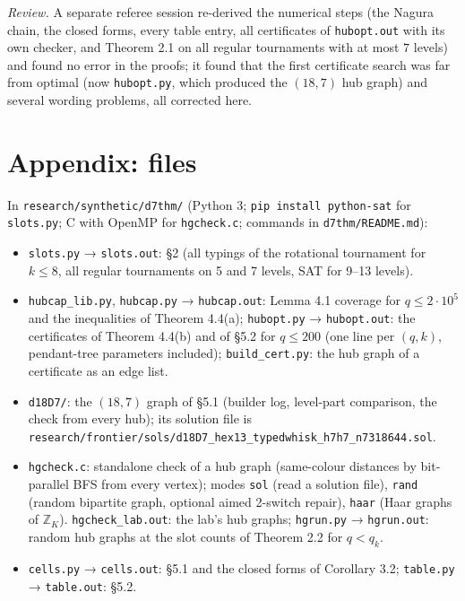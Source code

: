 \documentclass[
  10pt,
]{article}
\providecommand{\tightlist}{%
  \setlength{\itemsep}{0pt}\setlength{\parskip}{0pt}}
\begin{document}
\emph{Review.} A separate referee session re-derived the numerical steps
(the Nagura chain, the closed forms, every table entry, all certificates
of \texttt{hubopt.out} with its own checker, and Theorem 2.1 on all
regular tournaments with at most \(7\) levels) and found no error in the
proofs; it found that the first certificate search was far from optimal
(now \texttt{hubopt.py}, which produced the \((18,7)\) hub graph) and
several wording problems, all corrected here.

\hypertarget{appendix-files}{%
\section{Appendix: files}\label{appendix-files}}

In \texttt{research/synthetic/d7thm/} (Python 3;
\texttt{pip\ install\ python-sat} for \texttt{slots.py}; C with OpenMP
for \texttt{hgcheck.c}; commands in \texttt{d7thm/README.md}):

\begin{itemize}
\tightlist
\item
  \texttt{slots.py} → \texttt{slots.out}: §2 (all typings of the
  rotational tournament for \(k\le8\), all regular tournaments on 5 and
  7 levels, SAT for 9--13 levels).
\item
  \texttt{hubcap\_lib.py}, \texttt{hubcap.py} → \texttt{hubcap.out}:
  Lemma 4.1 coverage for \(q\le2\cdot10^5\) and the inequalities of
  Theorem 4.4(a); \texttt{hubopt.py} → \texttt{hubopt.out}: the
  certificates of Theorem 4.4(b) and of §5.2 for \(q\le200\) (one line
  per \((q,k)\), pendant-tree parameters included);
  \texttt{build\_cert.py}: the hub graph of a certificate as an edge
  list.
\item
  \texttt{d18D7/}: the \((18,7)\) graph of §5.1 (builder log, level-part
  comparison, the check from every hub); its solution file is
  \texttt{research/frontier/sols/d18D7\_hex13\_typedwhisk\_h7h7\_n7318644.sol}.
\item
  \texttt{hgcheck.c}: standalone check of a hub graph (same-colour
  distances by bit-parallel BFS from every vertex); modes \texttt{sol}
  (read a solution file), \texttt{rand} (random bipartite graph,
  optional aimed 2-switch repair), \texttt{haar} (Haar graphs of
  \(\mathbb Z_K\)). \texttt{hgcheck\_lab.out}: the lab's hub graphs;
  \texttt{hgrun.py} → \texttt{hgrun.out}: random hub graphs at the slot
  counts of Theorem 2.2 for \(q<q_k\).
\item
  \texttt{cells.py} → \texttt{cells.out}: §5.1 and the closed forms of
  Corollary 3.2; \texttt{table.py} → \texttt{table.out}: §5.2.
\end{itemize}
\end{document}

